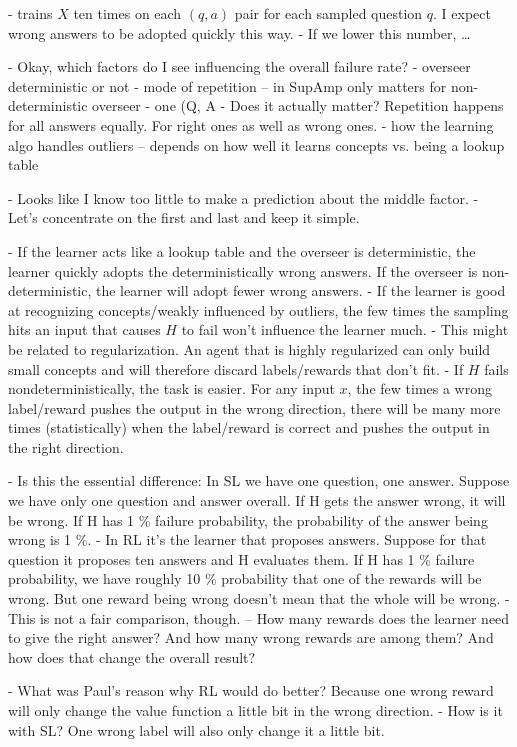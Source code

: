 \documentclass{farlamp}
\begin{document}
- \textcite{CSASump} trains $X$ ten times on each $(q, a)$ pair for each sampled
question $q$. I expect wrong answers to be adopted quickly this way.
- If we lower this number, …

- Okay, which factors do I see influencing the overall failure rate?
    - overseer deterministic or not
    - mode of repetition
        – in SupAmp only matters for non-deterministic overseer
        - one (Q, A
        - Does it actually matter? Repetition happens for all answers equally.
        For right ones as well as wrong ones.
    - how the learning algo handles outliers – depends on how well it learns
    concepts vs. being a lookup table

- Looks like I know too little to make a prediction about the middle factor.
- Let's concentrate on the first and last and keep it simple.

- If the learner acts like a lookup table and the overseer is deterministic, the
learner quickly adopts the deterministically wrong answers. If the overseer is
non-deterministic, the learner will adopt fewer wrong answers.
- If the learner is good at recognizing concepts/weakly influenced by outliers,
the few times the sampling hits an input that causes $H$ to fail won't influence
the learner much.
    - This might be related to regularization. An agent that is highly
    regularized can only build small concepts and will therefore discard
    labels/rewards that don't fit.
- If $H$ fails nondeterministically, the task is easier. For any input $x$, the
few times a wrong label/reward pushes the output in the wrong direction, there
will be many more times (statistically) when the label/reward is correct and
pushes the output in the right direction.

- Is this the essential difference: In SL we have one question, one answer.
Suppose we have only one question and answer overall. If H gets the answer
wrong, it will be wrong. If H has 1 \% failure probability, the probability of
the answer being wrong is 1 \%.
- In RL it's the learner that proposes answers. Suppose for that question it
proposes ten answers and H evaluates them. If H has 1 \% failure probability,
we have roughly 10 \% probability that one of the rewards will be wrong. But one
reward being wrong doesn't mean that the whole will be wrong.
- This is not a fair comparison, though. – How many rewards does the learner
need to give the right answer? And how many wrong rewards are among them? And
how does that change the overall result?

- What was Paul's reason why RL would do better? Because one wrong reward will
only change the value function a little bit in the wrong direction.
- How is it with SL? One wrong label will also only change it a little bit.
\end{document}
